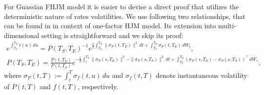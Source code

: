 \documentclass[pdftex,11pt,a4paper] {article}
\begin{document}
For Guassian FHJM model it is easier to devise a direct proof that utilizes the deterministic nature of rates volatilities. We use following two relationships, that can be found in \cite{Henrard2005} in context of one-factor HJM model. Its extension into multi-dimensional setting is straightforward and we skip its proof: 
\begin{equation}\label{eq:futures_conv_Gauss1}
\begin{split}
e^{\int_{T_S}^{T_E}r(u)\,du}=P(T_S,T_E)^{-1}e^{\frac{1}{2}\int_{T_S}^{T_E}\|\sigma_P(t,T_E)\|^2\,dt+\int_{T_S}^{T_E}\sigma_P(t,T_E)\,dW_t},\\
P(T_S,T_E)=\frac{P(t,T_E)}{P(t,T_S)}e^{-\frac{1}{2}\int_{t}^{T_S}\|\sigma_P(s,T_E)\|^2-\|\sigma_P(s,T_S)\|^2\,dt+\int_{T_S}^{T_E}\left(\sigma_P(s,T_E)-\sigma_P(s,T_S)\right)^\top\,dW_s},
\end{split}
\end{equation}
where $\sigma_P(t,T):=\int_t^T\sigma_f(t,u)\,du$ and $\sigma_f(t,T)$ denote instantaneous volatility of $P(t,T)$ and $f(t,T)$, respectively. 
\end{document}
